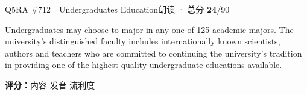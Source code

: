 \begin{qblock}{Q5\quad RA \#712\ \ Undergraduates Education}{朗读 · 总分 \textcolor{cAccent}{\bfseries 24}/90}
\begin{promptbox}
Undergraduates may choose to major in any one of 125 academic majors. The university's distinguished faculty includes internationally known scientists, authors and teachers who are committed to continuing the university's tradition in providing one of the highest quality undergraduate educations available.
\end{promptbox}
\asrlegend
\begin{asrbox}
               \pse \pse {}     \pse {}         \pse {}         \pse \pse {}  
\end{asrbox}
\smallskip
{\small\textbf{评分：}内容  \quad\textperiodcentered\quad 发音  \quad\textperiodcentered\quad 流利度 }
\end{qblock}

